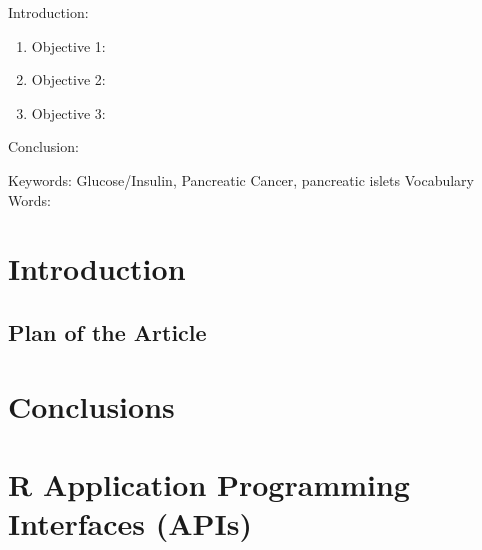 


\twocolumn
\scriptsize
\begin{frontmatter}
		\title{}
		\author{}
		\address{The Mathematical Learning Space}
\end{frontmatter}	

Introduction:
\begin{enumerate}
\item Objective 1:
\item Objective 2:
\item Objective 3:
\end{enumerate}
Conclusion:

Keywords:  Glucose/Insulin, Pancreatic Cancer, pancreatic islets
Vocabulary Words:

\section{Introduction}

\subsection{Plan of the Article}


\section{Conclusions}


\section{R Application Programming Interfaces (APIs)}




